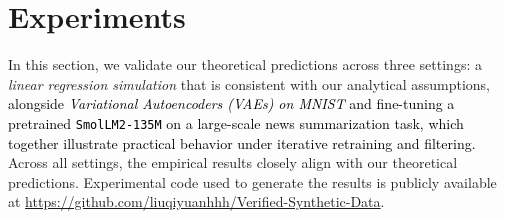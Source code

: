 
\section{Experiments}\label{sec:experiment}

In this section, we validate our theoretical predictions across three settings: a \emph{linear regression simulation} that is consistent with our analytical assumptions,
\textcolor{black}{alongside \emph{Variational Autoencoders (VAEs) on MNIST} and fine-tuning a pretrained \texttt{SmolLM2-135M} \citep{allal2025smollm2smolgoesbig} on a large-scale news summarization task,
which together illustrate practical behavior under iterative retraining and filtering.}
Across all settings, the empirical results closely align with our theoretical predictions. Experimental code used to generate the results is publicly
available at \url{https://github.com/liuqiyuanhhh/Verified-Synthetic-Data}.

